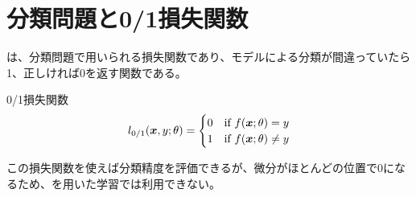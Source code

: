 \documentclass[../../../topic_machine-learning]{subfiles}
\begin{document}
\sectionline
\section{分類問題と0/1損失関数}

は、分類問題で用いられる損失関数であり、モデルによる分類が間違っていたら1、正しければ0を返す関数である。

\begin{definition}{0/1損失関数}
  \begin{equation*}
    l_{0/1}(\vb*{x}, y; \theta) = \begin{cases}
      0 & \text{if } f(\vb*{x}; \theta) = y \\
      1 & \text{if } f(\vb*{x}; \theta) \neq y
    \end{cases}
  \end{equation*}
\end{definition}

この損失関数を使えば分類精度を評価できるが、微分がほとんどの位置で0になるため、を用いた学習では利用できない。
\end{document}
